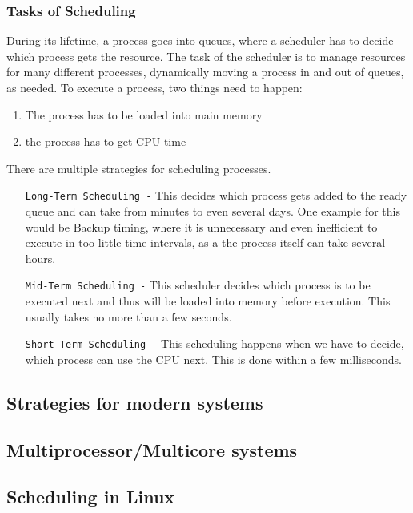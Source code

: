 \documentclass[a4paper, 11pt]{article}
\begin{document}
    \subsubsection{Tasks of Scheduling}
    During its lifetime, a process goes into queues, where a scheduler has to decide which process gets the resource. The task of the scheduler is to manage 
    resources for many different processes, dynamically moving a process in and out of queues, as needed. To execute a process, two things need to happen:
    \begin{enumerate}
      \item The process has to be loaded into main memory
      \item the process has to get CPU time
    \end{enumerate} 
    There are multiple strategies for scheduling processes. 
    \begin{itemize}[leftmargin=\parindent+1.65in]
      \item[\texttt{Long-Term Scheduling -}] This decides which process gets 
      added to the ready queue and can take from minutes to even several days. One example for this would be Backup timing, where it is unnecessary and even
      inefficient to execute in too little time intervals, as a the process itself can take several hours.
      \item[\texttt{Mid-Term Scheduling -}] This scheduler decides which process is to be executed next and thus will be loaded into memory before execution.
      This usually takes no more than a few seconds.
      \item[\texttt{Short-Term Scheduling -}] This scheduling happens when we have to decide, which process can use the CPU next. This is done within a few milliseconds.
    \end{itemize}


    \subsection{Strategies for modern systems}
    \subsection{Multiprocessor/Multicore systems}
    \subsection{Scheduling in Linux}
\end{document}

